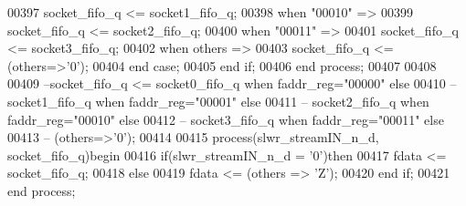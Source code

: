 \begin{DoxyCode}
00397             \textcolor{vhdlchar}{socket_fifo_q} \textcolor{vhdlchar}{<=} \textcolor{vhdlchar}{socket1_fifo_q};
00398          \textcolor{keywordflow}{when} \textcolor{vhdllogic}{"00010"} \textcolor{vhdlchar}{=}\textcolor{vhdlchar}{>} 
00399             \textcolor{vhdlchar}{socket_fifo_q} \textcolor{vhdlchar}{<=} \textcolor{vhdlchar}{socket2_fifo_q};
00400          \textcolor{keywordflow}{when} \textcolor{vhdllogic}{"00011"} \textcolor{vhdlchar}{=}\textcolor{vhdlchar}{>} 
00401             \textcolor{vhdlchar}{socket_fifo_q} \textcolor{vhdlchar}{<=} \textcolor{vhdlchar}{socket3_fifo_q};
00402          \textcolor{keywordflow}{when} \textcolor{keywordflow}{others} \textcolor{vhdlchar}{=}\textcolor{vhdlchar}{>} 
00403             \textcolor{vhdlchar}{socket_fifo_q} \textcolor{vhdlchar}{<=} \textcolor{vhdlchar}{(}\textcolor{keywordflow}{others}\textcolor{vhdlchar}{=}\textcolor{vhdlchar}{>}\textcolor{vhdlchar}{'}\textcolor{vhdllogic}{}\textcolor{vhdllogic}{0}\textcolor{vhdlchar}{'}\textcolor{vhdlchar}{)};
00404       \textcolor{keywordflow}{end} \textcolor{keywordflow}{case};
00405     \textcolor{keywordflow}{end} \textcolor{keywordflow}{if}; 
00406 \textcolor{keywordflow}{end} \textcolor{keywordflow}{process};
00407 
00408 
00409 \textcolor{keyword}{--socket\_fifo\_q <= socket0\_fifo\_q when faddr\_reg="00000" else }
00410 \textcolor{keyword}{--                    socket1\_fifo\_q when faddr\_reg="00001" else}
00411 \textcolor{keyword}{--                    socket2\_fifo\_q when faddr\_reg="00010" else}
00412 \textcolor{keyword}{--                    socket3\_fifo\_q when faddr\_reg="00011" else}
00413 \textcolor{keyword}{--                    (others=>'0');}
00414 
00415 \textcolor{keywordflow}{process}(slwr_streamIN_n_d, socket_fifo_q)\textcolor{keywordflow}{begin}
00416     \textcolor{keywordflow}{if}\textcolor{vhdlchar}{(}\textcolor{vhdlchar}{slwr_streamIN_n_d} \textcolor{vhdlchar}{=} \textcolor{vhdlchar}{'}\textcolor{vhdllogic}{}\textcolor{vhdllogic}{0}\textcolor{vhdlchar}{'}\textcolor{vhdlchar}{)}\textcolor{keywordflow}{then}
00417         \textcolor{vhdlchar}{fdata} \textcolor{vhdlchar}{<=} \textcolor{vhdlchar}{socket_fifo_q};
00418     \textcolor{keywordflow}{else}
00419         \textcolor{vhdlchar}{fdata} \textcolor{vhdlchar}{<=} \textcolor{vhdlchar}{(}\textcolor{keywordflow}{others} \textcolor{vhdlchar}{=}\textcolor{vhdlchar}{>} \textcolor{vhdlchar}{'}\textcolor{vhdlchar}{Z}\textcolor{vhdlchar}{'}\textcolor{vhdlchar}{)};   
00420     \textcolor{keywordflow}{end} \textcolor{keywordflow}{if};
00421 \textcolor{keywordflow}{end} \textcolor{keywordflow}{process};

\end{DoxyCode}
